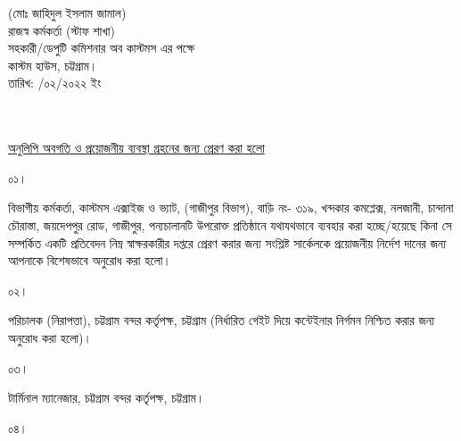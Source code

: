 \documentclass[12pt]{article}
\newcommand{\fileno}{\eif}
\newcommand{\rodt}{তারিখ: \hspace{2.0em}/০২/২০২২ ইং}
\begin{document}
\begin{minipage}[t]{0.60\linewidth}
\hspace{1em}
\end{minipage}
\begin{minipage}[t]{0.40\linewidth}
\begin{center}
\footnotesize{(মোঃ জাহিদুল ইসলাম জামাল)}
\\
\footnotesize{রাজস্ব কর্মকর্তা (স্টাফ শাখা)}
\\
\scriptsize{সহকারী/ডেপুটি কমিশনার অব কাস্টমস এর পক্ষে}
\\
\scriptsize{কাস্টম হাউস, চট্টগ্রাম।}
\\
\scriptsize{{\rodt}}
\end{center}
\end{minipage}
\\
\scriptsize{{\fileno}}
\\
\underline{\scriptsize{অনুলিপি অবগতি ও প্রয়োজনীয় ব্যবস্থা গ্রহনের জন্য প্রেরণ করা হলো}}
\\
\begin{minipage}[t]{0.06\linewidth}
\scriptsize{০১।}
\end{minipage}
\begin{minipage}[t]{0.94\linewidth}
\scriptsize{বিভাগীয় কর্মকর্তা, কাস্টমস এক্সাইজ ও ভ্যাট, (গাজীপুর বিভাগ),
বাড়ি নং- ৩১৯,
খন্দকার কমপ্লেক্স, নলজানী,
চান্দানা চৌরাস্তা, জয়দেপপুর রোড,
গাজীপুর,
পন্যচালানটি উপরোক্ত প্রতিষ্ঠানে যথাযথভাবে
ব্যবহার করা হচ্ছে/হয়েছে কিনা সে
সম্পর্কিত একটি প্রতিবেদন নিম্ন স্বাক্ষরকারীর
দপ্তরে প্রেরণ করার জন্য সংশ্লিষ্ট সার্কেলকে
প্রয়োজনীয় নির্দেশ দানের জন্য আপনাকে
বিশেষভাবে অনুরোধ করা হলো।
}
\end{minipage}
\begin{minipage}[t]{0.06\linewidth}
\scriptsize{০২।}
\end{minipage}
\begin{minipage}[t]{0.94\linewidth}
\scriptsize{পরিচালক (নিরাপত্তা), চট্টগ্রাম বন্দর কর্তৃপক্ষ, চট্টগ্রাম (নির্ধারিত গেইট দিয়ে কন্টেইনার নির্গমন নিশ্চিত করার জন্য অনুরোধ করা হলো)।}
\end{minipage}
\begin{minipage}[t]{0.06\linewidth}
\scriptsize{০৩।}
\end{minipage}
\begin{minipage}[t]{0.94\linewidth}
\scriptsize{টার্মিনাল ম্যানেজার, চট্টগ্রাম বন্দর কর্তৃপক্ষ, চট্টগ্রাম।}
\end{minipage}
\begin{minipage}[t]{0.06\linewidth}
\scriptsize{০৪।}
\end{minipage}
\end{document}
